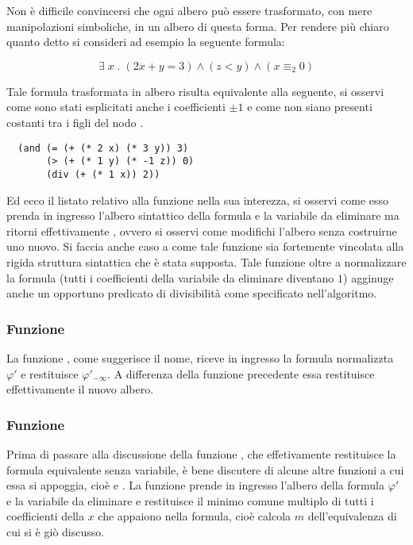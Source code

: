 \documentclass[11pt,letterpaper,twoside]{article}
\begin{document}
Non è difficile convincersi che ogni albero può essere trasformato, con mere
manipolazioni simboliche, in un albero di questa forma. Per rendere più chiaro
quanto detto si consideri ad esempio la seguente formula:

$$ \exists \; x \; . \; (2x + y = 3) \land (z < y) \land (x \equiv_{2} 0) $$

Tale formula trasformata in albero risulta equivalente alla seguente, si osservi
come sono stati esplicitati anche i coefficienti $\pm 1$ e come non siano
presenti costanti tra i figli del nodo \inline{+}.

\begin{verbatim}
  (and (= (+ (* 2 x) (* 3 y)) 3)
       (> (+ (* 1 y) (* -1 z)) 0)
       (div (+ (* 1 x)) 2))
\end{verbatim}

Ed ecco il listato relativo alla funzione  nella sua
interezza, si osservi come esso prenda in ingresso l'albero sintattico della
formula e la variabile da eliminare ma ritorni effettivamente ,
ovvero si osservi come modifichi l'albero senza costruirne uno nuovo. Si faccia
anche caso a come tale funzione sia fortemente vincolata alla rigida struttura
sintattica che è stata supposta. Tale funzione oltre a normalizzare la formula
(tutti i coefficienti della variabile da eliminare diventano $1$) agginuge anche
un opportuno predicato di divisibilità come specificato nell'algoritmo.

\subsubsection{Funzione } 

La funzione , come suggerisce il nome, riceve in ingresso la
formula normalizzta $\varphi'$ e restituisce $\varphi'_{- \infty}$. A differenza
della funzione precedente essa restituisce effettivamente il nuovo albero.

\subsubsection{Funzione } 

Prima di passare alla discussione della funzione , che
effetivamente restituisce la formula equivalente senza variabile, è bene
discutere di alcune altre funzioni a cui essa si appoggia, cioè  e
.  La funzione  prende in ingresso l'albero della formula $\varphi'$ e la variabile
da eliminare e restituisce il minimo comune multiplo di tutti i coefficienti
della $x$ che appaiono nella formula, cioè calcola $m$ dell'equivalenza di cui
si è giò discusso.
\end{document}
